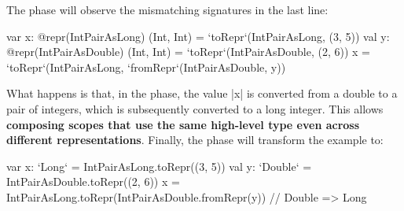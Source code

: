 The \coerce{} phase will observe the mismatching signatures in the last line:

\begin{lstlisting-nobreak}
var x: @repr(IntPairAsLong) (Int, Int) = `toRepr`(IntPairAsLong, (3, 5))
val y: @repr(IntPairAsDouble) (Int, Int) = `toRepr`(IntPairAsDouble, (2, 6))
x = `toRepr`(IntPairAsLong, `fromRepr`(IntPairAsDouble, y))
\end{lstlisting-nobreak}

What happens is that, in the \coerce{} phase, the value |x| is converted from a double to a pair of integers, which is subsequently converted to a long integer. This allows \textbf{composing scopes that use the same high-level type even across different representations}. Finally, the \commit{} phase will transform the example to:

\begin{lstlisting-nobreak}
var x: `Long` = IntPairAsLong.toRepr((3, 5))
val y: `Double` = IntPairAsDouble.toRepr((2, 6))
x = IntPairAsLong.toRepr(IntPairAsDouble.fromRepr(y)) // Double => Long
\end{lstlisting-nobreak}







